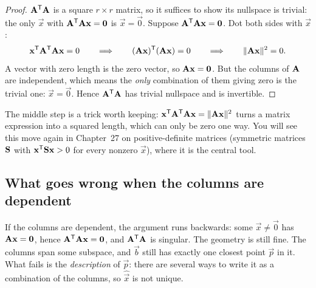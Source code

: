 \begin{proof}
$\mathbf{A}^{\mathsf{T}}\mathbf{A}$ is a square $r\times r$ matrix, so it suffices to show its nullspace is trivial:
the only $\vec{x}$ with $\mathbf{A}^{\mathsf{T}}\mathbf{A}\mathbf{x}=\mathbf{0}$ is $\vec{x}=\vec{0}$. Suppose
$\mathbf{A}^{\mathsf{T}}\mathbf{A}\mathbf{x}=\mathbf{0}$. Dot both sides with $\vec{x}$:
\[
  \mathbf{x}^{\mathsf{T}}\mathbf{A}^{\mathsf{T}}\mathbf{A}\mathbf{x} = 0
  \qquad\Longrightarrow\qquad
  (\mathbf{A}\mathbf{x})^{\mathsf{T}}(\mathbf{A}\mathbf{x}) = 0
  \qquad\Longrightarrow\qquad
  \lVert\mathbf{A}\mathbf{x}\rVert^2 = 0.
\]
A vector with zero length is the zero vector, so $\mathbf{A}\mathbf{x}=\mathbf{0}$. But the columns of
$\mathbf{A}$ are independent, which means the \emph{only} combination of them giving zero is the
trivial one: $\vec{x}=\vec{0}$. Hence $\mathbf{A}^{\mathsf{T}}\mathbf{A}$ has trivial nullspace and is invertible.
\end{proof}

The middle step is a trick worth keeping: $\mathbf{x}^{\mathsf{T}}\mathbf{A}^{\mathsf{T}}\mathbf{A}\mathbf{x}=\lVert\mathbf{A}\mathbf{x}\rVert^2$
turns a matrix expression into a squared length, which can only be zero one way. You will see this
move again in Chapter~27 on positive-definite matrices (symmetric matrices $\mathbf{S}$ with
$\mathbf{x}^{\mathsf{T}}\mathbf{S}\mathbf{x}>0$ for every nonzero $\vec{x}$), where it is the central tool.

\subsection{What goes wrong when the columns are dependent}

If the columns are dependent, the argument runs backwards: some $\vec{x}\neq\vec{0}$ has
$\mathbf{A}\mathbf{x}=\mathbf{0}$, hence $\mathbf{A}^{\mathsf{T}}\mathbf{A}\mathbf{x}=\mathbf{0}$, and $\mathbf{A}^{\mathsf{T}}\mathbf{A}$ is
singular. The geometry is still fine. The columns span some subspace, and $\vec{b}$ still has
exactly one closest point $\vec{p}$ in it. What fails is the \emph{description} of $\vec{p}$: there
are several ways to write it as a combination of the columns, so $\hat{\vec{x}}$ is not unique.


